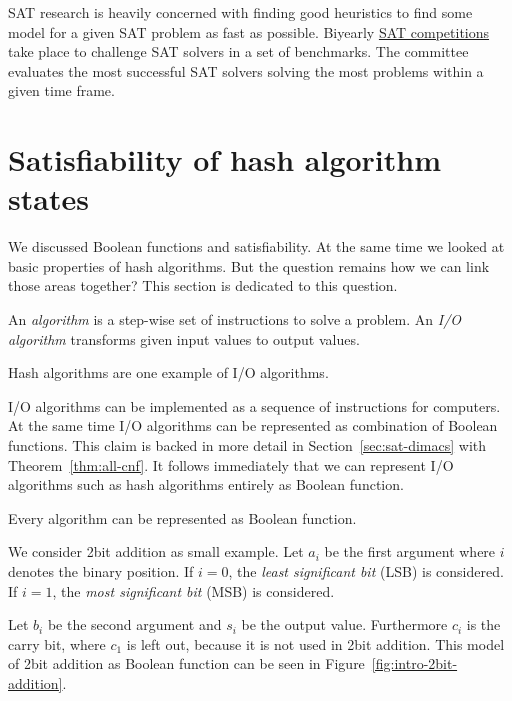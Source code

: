 SAT research is heavily concerned with finding good heuristics to find some model
for a given SAT problem as fast as possible. Biyearly
\href{http://satcompetition.org/}{SAT competitions} take place to challenge
SAT solvers in a set of benchmarks. The committee evaluates the most successful
SAT solvers solving the most problems within a given time frame.

\section{Satisfiability of hash algorithm states}
\label{sec:intro-algo-sat}
%
We discussed Boolean functions and satisfiability. At the same time we looked
at basic properties of hash algorithms. But the question remains how we can
link those areas together? This section is dedicated to this question.

\begin{defi}
  An \emph{algorithm} is a step-wise set of instructions to solve a problem.
  An \emph{I/O algorithm} transforms given input values to output values.
\end{defi}

Hash algorithms are one example of I/O algorithms.

I/O algorithms can be implemented as a sequence of instructions for computers.
At the same time I/O algorithms can be represented as combination of Boolean
functions. This claim is backed in more detail in Section~\ref{sec:sat-dimacs}
with Theorem~\ref{thm:all-cnf}. It follows immediately that we can represent
I/O algorithms such as hash algorithms entirely as Boolean function.

\begin{theorem}
  Every algorithm can be represented as Boolean function.
\end{theorem}

We consider 2bit addition as small example. Let $a_{i}$ be the first argument
where $i$ denotes the binary position. If $i=0$, the \emph{least significant bit}
(LSB) is considered. If $i=1$, the \emph{most significant bit} (MSB) is considered.

Let $b_{i}$ be the second argument and $s_{i}$ be the output value.
Furthermore $c_{i}$ is the carry bit, where $c_1$ is left out, because
it is not used in 2bit addition. This model of 2bit addition as Boolean
function can be seen in Figure~\ref{fig:intro-2bit-addition}.

